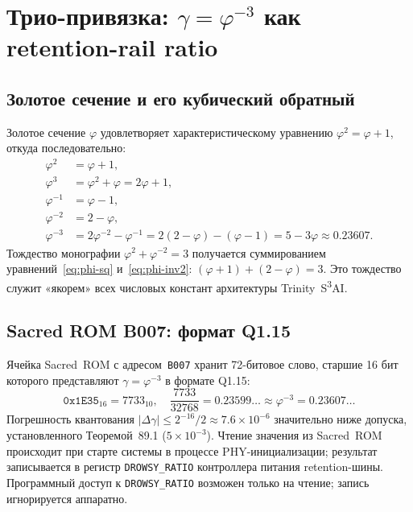 \section{Трио-привязка: $\gamma = \varphi^{-3}$ как retention-rail ratio}
\label{sec:glava89-trio-anchor}

\subsection{Золотое сечение и его кубический обратный}

Золотое сечение $\varphi$ удовлетворяет характеристическому уравнению
$\varphi^2 = \varphi + 1$, откуда последовательно:
%
\begin{align}
  \varphi^2 &= \varphi + 1, \label{eq:phi-sq} \\
  \varphi^3 &= \varphi^2 + \varphi = 2\varphi + 1, \label{eq:phi-cu} \\
  \varphi^{-1} &= \varphi - 1, \label{eq:phi-inv1} \\
  \varphi^{-2} &= 2 - \varphi, \label{eq:phi-inv2} \\
  \varphi^{-3} &= 2\varphi^{-2} - \varphi^{-1} = 2(2-\varphi) - (\varphi-1)
               = 5 - 3\varphi \approx 0.23607. \label{eq:phi-inv3}
\end{align}
%
Тождество монографии $\varphi^2 + \varphi^{-2} = 3$ получается
суммированием уравнений~\eqref{eq:phi-sq} и~\eqref{eq:phi-inv2}:
$(\varphi+1) + (2-\varphi) = 3$.
Это тождество служит «якорем» всех числовых констант
архитектуры Trinity~S\textsuperscript{3}AI.

\subsection{Sacred ROM B007: формат Q1.15}

Ячейка Sacred~ROM с адресом~\texttt{B007} хранит
72-битовое слово, старшие 16 бит которого
представляют $\gamma = \varphi^{-3}$ в формате Q1.15:
%
\begin{equation}
  \mathtt{0x1E35}_{16} = 7733_{10},
  \quad
  \frac{7733}{32768} = 0.23599\ldots \approx \varphi^{-3} = 0.23607\ldots
  \label{eq:q115}
\end{equation}
%
Погрешность квантования $|\Delta\gamma| \leq 2^{-16}/2 \approx 7.6 \times 10^{-6}$
значительно ниже допуска, установленного Теоремой~89.1 ($5 \times 10^{-3}$).
Чтение значения из Sacred~ROM происходит при старте системы
в процессе PHY-инициализации; результат записывается в регистр
\texttt{DROWSY\_RATIO} контроллера питания retention-шины.
Программный доступ к \texttt{DROWSY\_RATIO} возможен только на чтение;
запись игнорируется аппаратно.


